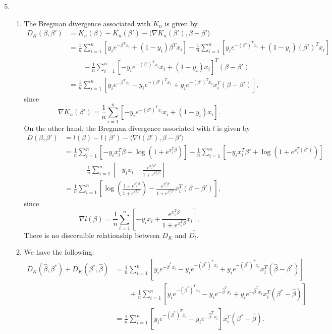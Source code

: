 \documentclass[12pt]{article}
\begin{document}
\begin{enumerate}
\setcounter{enumi}{4}
\item
\begin{enumerate}[label=(\roman*)]
\item
The Bregman divergence associated with $K_n$ is given by
\begin{align*}
D_K(\beta, \beta') &= K_n(\beta) - K_n(\beta') - \langle \nabla K_n(\beta'), \beta - \beta' \rangle \\
&= \frac{1}{n} \sum_{i=1}^n [y_i e^{-\beta^Tx_i} + (1 - y_i)\beta^Tx_i] - \frac{1}{n} \sum_{i=1}^n [y_i e^{-(\beta')^Tx_i} + (1 - y_i)(\beta')^Tx_i] \\
&\qquad- \frac{1}{n} \sum_{i=1}^n [-y_i e^{-(\beta')^Tx_i}x_i + (1 - y_i)x_i]^T(\beta - \beta') \\
&= \frac{1}{n} \sum_{i=1}^n [y_i e^{-\beta^Tx_i} - y_i e^{-(\beta')^Tx_i} + y_i e^{-(\beta')^Tx_i}x_i^T(\beta - \beta')],
\end{align*}
since
\begin{equation*}
\nabla K_n(\beta') = \frac{1}{n} \sum_{i=1}^n [-y_i e^{-(\beta')^Tx_i}x_i + (1 - y_i)x_i].
\end{equation*}
On the other hand, the Bregman divergence associated with $l$ is given by
\begin{align*}
D(\beta, \beta') &= l(\beta) - l(\beta') - \langle \nabla l(\beta'), \beta - \beta' \rangle \\
&= \frac{1}{n} \sum_{i=1}^n [-y_ix_i^T\beta + \log(1 + e^{x_i^T\beta})] - \frac{1}{n} \sum_{i=1}^n [-y_ix_i^T\beta' + \log(1 + e^{x_i^T(\beta')})] \\
&\qquad - \frac{1}{n} \sum_{i=1}^n \left[-y_ix_i + \frac{e^{x_i^T\beta'}}{1 + e^{x_i^T\beta'}}\right] \\
&= \frac{1}{n} \sum_{i=1}^n \left[\log\left(\frac{1 + e^{x_i^T\beta}}{1 + e^{x_i^T\beta'}}\right) - \frac{e^{x_i^T\beta'}}{1 + e^{x_i^T\beta'}}x_i^T(\beta - \beta')\right],
\end{align*}
since
\begin{equation*}
\nabla l(\beta) = \frac{1}{n} \sum_{i=1}^n \left[-y_ix_i + \frac{e^{x_i^T\beta}}{1 + e^{x_i^T\beta}}x_i\right].
\end{equation*}
There is no discernible relationship between $D_K$ and $D_l$.

\item
We have the following:
\begin{align*}
D_K(\hat{\beta}, \beta^*) + D_K(\beta^*, \hat{\beta}) &= \frac{1}{n} \sum_{i=1}^n [y_i e^{-\hat{\beta}^Tx_i} - y_i e^{-(\beta^*)^Tx_i} + y_i e^{-(\beta^*)^Tx_i}x_i^T(\hat{\beta }- \beta^*)] \\
&\qquad+ \frac{1}{n} \sum_{i=1}^n [y_i e^{-(\beta^*)^Tx_i} - y_i e^{-\hat{\beta}^Tx_i} + y_i e^{-\hat{\beta}^Tx_i}x_i^T(\beta^* - \hat{\beta})] \\
&= \frac{1}{n} \sum_{i=1}^n [y_i e^{-(\beta^*)^Tx_i} - y_i e^{-\hat{\beta}^Tx_i}]x_i^T(\beta^* - \hat{\beta}).
\end{align*}


\end{enumerate}
\end{enumerate}
\end{document}
